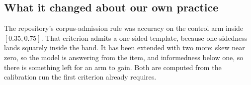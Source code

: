 \subsection{What it changed about our own practice}

The repository's corpus-admission rule was accuracy on the control arm inside
$[0.35, 0.75]$. That criterion admits a one-sided template, because
one-sidedness lands squarely inside the band. It has been extended with two
more: skew near zero, so the model is answering from the item, and informedness
below one, so there is something left for an arm to gain. Both are computed from
the calibration run the first criterion already requires.
